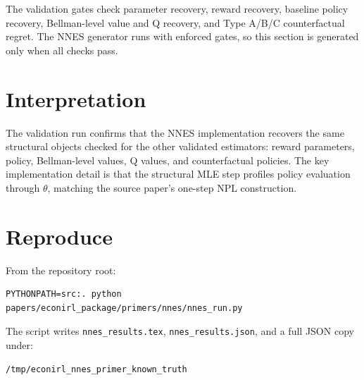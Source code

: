 \documentclass[10pt]{article}
\begin{document}
The validation gates check parameter recovery, reward recovery, baseline
policy recovery, Bellman-level value and Q recovery, and Type A/B/C
counterfactual regret. The NNES generator runs with enforced gates, so this
section is generated only when all checks pass.



\section{Interpretation}

The validation run confirms that the NNES implementation recovers the same
structural objects checked for the other validated estimators: reward
parameters, policy, Bellman-level values, Q values, and counterfactual
policies. The key implementation detail is that the structural MLE step
profiles policy evaluation through \(\theta\), matching the source paper's
one-step NPL construction.

\section{Reproduce}

From the repository root:
\begin{verbatim}
PYTHONPATH=src:. python papers/econirl_package/primers/nnes/nnes_run.py
\end{verbatim}

The script writes \texttt{nnes\_results.tex},
\texttt{nnes\_results.json}, and a full JSON copy under:
\begin{verbatim}
/tmp/econirl_nnes_primer_known_truth
\end{verbatim}



\end{document}
